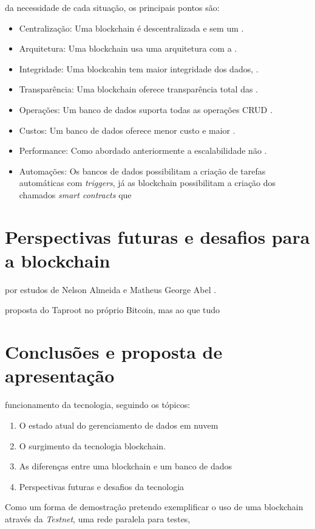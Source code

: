 \documentclass[acronym,symbols]{fei}
\begin{document}
 da necessidade de cada situação, os principais pontos são:

\begin{itemize}
    \item Centralização: Uma blockchain é descentralizada e sem um .
    \item Arquitetura: Uma blockchain usa uma arquitetura com a .
    \item Integridade: Uma blockcahin tem maior integridade dos dados, .
    \item Transparência: Uma blockchain oferece transparência total das .
    \item Operações: Um banco de dados suporta todas as operações CRUD .
    \item Custos: Um banco de dados oferece menor custo e maior .
    \item Performance: Como abordado anteriormente a escalabilidade não .
    \item Automações: Os bancos de dados possibilitam a criação de tarefas automáticas com \textit{triggers}, já as blockchain possibilitam a criação dos chamados \textit{smart contracts} que     
\end{itemize}



\chapter{Perspectivas futuras e desafios para a blockchain}

 por estudos de Nelson Almeida \cite{redeHibridaMeshComLora} e Matheus George Abel \cite{topologiaMeshComLora}.

 proposta do Taproot \cite{taproot} no próprio Bitcoin, mas ao que tudo 

\chapter{Conclusões e proposta de apresentação}
 funcionamento da tecnologia, seguindo os tópicos:

\begin{enumerate}
    \item O estado atual do gerenciamento de dados em nuvem
    \item O surgimento da tecnologia blockchain.
    \item As diferenças entre uma blockchain e um banco de dados
    \item Perspectivas futuras e desafios da tecnologia
\end{enumerate}

Como um forma de demostração pretendo exemplificar o uso de uma blockchain através da \textit{Testnet}, uma rede paralela para testes, 

\printbibliography
\end{document}
